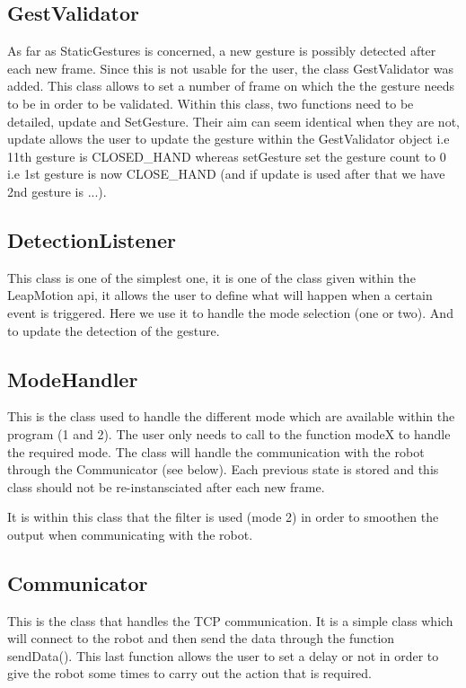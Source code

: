 \subsection{GestValidator}

As far as StaticGestures is concerned, a new gesture is possibly detected after each new frame. Since this is not usable for the user, the class GestValidator was added. This class allows to set a number of frame on which the the gesture needs to be in order to be validated.
Within this class, two functions need to be detailed, update and SetGesture. Their aim can seem identical when they are not, update allows the user to update the gesture within the GestValidator object i.e 11th gesture is CLOSED\_HAND whereas setGesture set the gesture count to 0 i.e 1st gesture is now CLOSE\_HAND (and if update is used after that we have 2nd gesture is ...).

\subsection{DetectionListener}

This class is one of the simplest one, it is one of the class given within the LeapMotion api, it allows the user to define what will happen when a certain event is triggered.
Here we use it to handle the mode selection (one or two). And to update the detection of the gesture.

\subsection{ModeHandler}

This is the class used to handle the different mode which are available within the program (1 and 2). The user only needs to call to the function modeX to handle the required mode. The class will handle the communication with the robot through the Communicator (see below). Each previous state is stored and this class should not be re-instansciated after each new frame.

It is within this class that the filter is used (mode 2) in order to smoothen the output when communicating with the robot.

\subsection{Communicator}

This is the class that handles the TCP communication. It is a simple class which will connect to the robot and then send the data through the function sendData(). This last function allows the user to set a delay or not in order to give the robot some times to carry out the action that is required.
